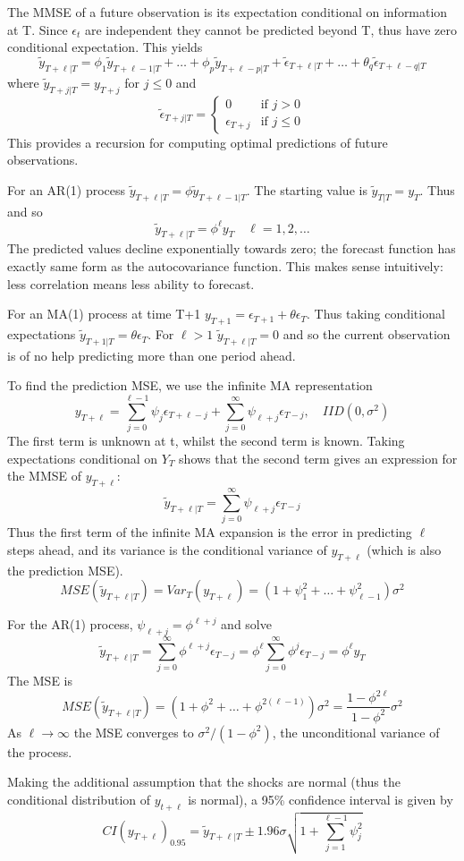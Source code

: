 \documentclass[DIV=14,titlepage=false]{scrreprt}
\begin{document}
The MMSE of a future observation is its expectation conditional on information at T. Since $\epsilon_t$ are independent they cannot be predicted beyond T, thus have zero conditional expectation. This yields
\[
    \tilde y_{T+\ell|T} = \phi_1 \tilde y_{T+\ell-1|T} + \dots + \phi_p \tilde y_{T+\ell-p|T} + \tilde \epsilon_{T+\ell|T} + \dots + \theta_q \tilde \epsilon_{T+\ell-q|T}
\]
where $\tilde y_{T+j|T} = y_{T+j} $ for $j \leq 0$ and 
\[
\tilde{\epsilon}_{T+j|T} = 
\begin{cases}
0 & \text{if } j > 0 \\
\epsilon_{T+j} & \text{if } j \leq 0
\end{cases}
\]
This provides a recursion for computing optimal predictions of future observations.
\begin{example}[AR(1)]
    For an AR(1) process $\tilde y_{T+\ell|T} = \phi \tilde y_{T+\ell-1|T}$. The starting value is $\tilde y_{T|T} = y_T$. Thus and so 
    \[
        \tilde y_{T+\ell|T} = \phi^{\ell} y_T \quad \ell = 1,2,\dots    
    \]
    The predicted values decline exponentially towards zero; the forecast function has exactly same form as the autocovariance function. This makes sense intuitively: less correlation means less ability to forecast.
\end{example}
\begin{example}[MA(1)]
    For an MA(1) process at time T+1 $y_{T+1} = \epsilon_{T+1} + \theta \epsilon_T$. Thus taking conditional expectations $\tilde y_{T+1|T} = \theta \epsilon_{T}$. For $\ell > 1$ $\tilde y_{T+\ell|T} = 0$ and so the current observation is of no help predicting more than one period ahead.
\end{example}
To find the prediction MSE, we use the infinite MA representation
\[
    y_{T+\ell} = \sum_{j=0}^{\ell -1 } \psi_j \epsilon_{T+\ell-j} + \sum_{j=0}^{\infty} \psi_{\ell+j} \epsilon_{T-j}, \quad IID(0, \sigma^2)
\]
The first term is unknown at t, whilst the second term is known. Taking expectations conditional on $Y_T$ shows that the second term gives an expression for the MMSE of $y_{T+\ell}$:
\[
    \tilde y_{T+\ell|T} = \sum_{j=0}^{\infty} \psi_{\ell+j} \epsilon_{T-j}
\]
Thus the first term of the infinite MA expansion is the error in predicting $\ell$ steps ahead, and its variance is the conditional variance of $y_{T+\ell}$ (which is also the prediction MSE).
\[
    MSE(\tilde y_{T+\ell|T}) = Var_T (y_{T+\ell}) = (1+\psi_1^2 + \dots + \psi_{\ell-1}^2) \sigma^2
\]
\begin{example}
    For the AR(1) process, $\psi_{\ell+ j} = \phi^{\ell+ j}$ and solve\[
        \tilde y_{T+\ell|T} = \sum_{j=0}^{\infty} \phi^{\ell+j} \epsilon_{T-j} = \phi^{\ell} \sum_{j=0}^{\infty} \phi^{j} \epsilon_{T-j} = \phi^{\ell} y_T
    \]
    The MSE is 
    \[
    MSE(\tilde y_{T+\ell|T}) = (1 + \phi^2 + \dots + \phi^{2(\ell-1)}) \sigma^2 = \frac{1-\phi^{2\ell}}{1-\phi^2} \sigma^2
    \]
    As $\ell \to \infty$ the MSE converges to $\sigma^2/(1-\phi^2)$, the unconditional variance of the process. 
\end{example}
Making the additional assumption that the shocks are normal (thus the conditional distribution of $y_{t+\ell}$ is normal), a 95\% confidence interval is given by
\[
    CI(y_{T+\ell})_{0.95} = \tilde y_{T+\ell|T} \pm 1.96\sigma \sqrt{1+\sum_{j=1}^{\ell-1} \psi_j^2} 
\]
\end{document}
